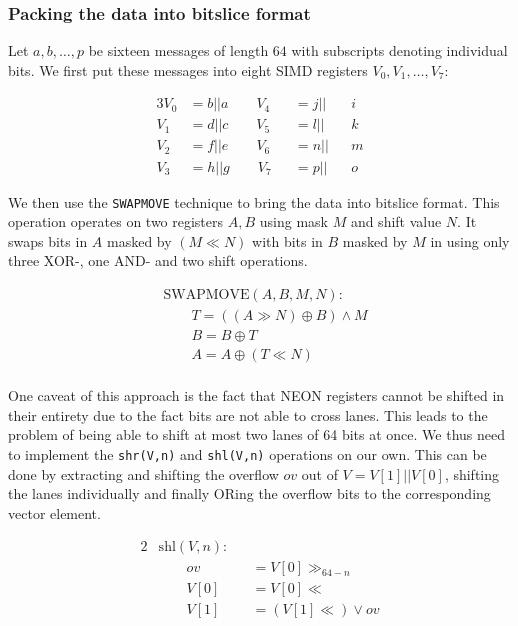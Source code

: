\subsubsection{Packing the data into bitslice format}

Let $a,b,\dots,p$ be sixteen messages of length $64$ with subscripts denoting
individual bits. We first put these messages into eight SIMD registers
$V_0,V_1,\dots,V_7$:

\begin{alignat*}{3}
    V_0&=b||a\qquad V_4&&=j||&&i \\
    V_1&=d||c\qquad V_5&&=l||&&k \\
    V_2&=f||e\qquad V_6&&=n||&&m \\
    V_3&=h||g\qquad V_7&&=p||&&o
\end{alignat*}

We then use the \texttt{SWAPMOVE} technique to bring the data into bitslice
format. This operation operates on two registers $A,B$ using mask $M$ and shift
value $N$. It swaps bits in $A$ masked by $(M\ll N)$ with bits in $B$ masked by
$M$ in using only three XOR-, one AND- and two shift operations.

\begin{align*}
    &\text{SWAPMOVE}(A,B,M,N): \\
    &\qquad T=((A\gg N)\oplus B)\land M \\
    &\qquad B=B\oplus T \\
    &\qquad A=A\oplus (T\ll N) \\
\end{align*}

One caveat of this approach is the fact that NEON registers cannot be shifted
in their entirety due to the fact bits are not able to cross lanes. This leads
to the problem of being able to shift at most two lanes of 64 bits at once. We
thus need to implement the \texttt{shr(V,n)} and \texttt{shl(V,n)} operations
on our own. This can be done by extracting and shifting the overflow $ov$ out
of $V=V[1]||V[0]$, shifting the lanes individually and finally ORing the
overflow bits to the corresponding vector element.

\begin{alignat*}{2}
    &\text{shl}(V,n): \\
    &\qquad ov&&=V[0]\gg_{64-n} \\
    &\qquad V[0]&&=V[0]\ll \\
    &\qquad V[1]&&=(V[1]\ll)\lor ov
\end{alignat*}

